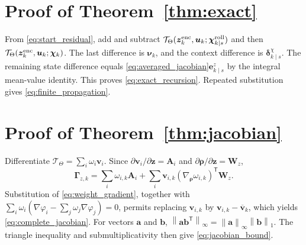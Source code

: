 \documentclass[journal]{IEEEtran}
\newcommand{\norm}[1]{\left\lVert #1\right\rVert}
\newcommand{\T}{\mathsf T}
\newcommand{\1}{\bm 1}
\begin{document}
\appendices
\section{Proof of Theorem~\ref{thm:exact}}
From \eqref{eq:start_residual}, add and subtract
$\mathcal T_\Theta(\bm z_k^{\rm enc},\bm u_k;
\bm\chi_{k\mid s}^{\rm roll})$ and then
$\mathcal T_\Theta(\bm z_k^{\rm enc},\bm u_k;\bm\chi_k)$.
The last difference is $\bm\nu_k$, and the context difference is
$\bm\delta_{k\mid s}^{\chi}$. The remaining state difference equals
\eqref{eq:averaged_jacobian}$\bm e_{k\mid s}^z$ by the integral
mean-value identity. This proves \eqref{eq:exact_recursion}. Repeated
substitution gives \eqref{eq:finite_propagation}.

\section{Proof of Theorem~\ref{thm:jacobian}}
Differentiate
$\mathcal T_\Theta=\sum_i\omega_i\bm v_i$. Since
$\partial\bm v_i/\partial\bm z=\bm A_i$ and
$\partial\bm\rho/\partial\bm z=\bm W_z$,
\begin{equation}
\bm\Gamma_{z,k}=\sum_i\omega_{i,k}\bm A_i+
\sum_i\bm v_{i,k}
(\nabla_{\bm\rho}\omega_{i,k})^\T\bm W_z.
\end{equation}
Substitution of \eqref{eq:weight_gradient}, together with
$\sum_i\omega_i(\nabla\varphi_i-\sum_j\omega_j\nabla\varphi_j)=0$,
permits replacing $\bm v_{i,k}$ by
$\bm v_{i,k}-\overline{\bm v}_k$, which yields
\eqref{eq:complete_jacobian}. For vectors $\bm a$ and $\bm b$,
$\norm{\bm a\bm b^\T}_\infty=\norm{\bm a}_\infty\norm{\bm b}_1$.
The triangle inequality and submultiplicativity then give
\eqref{eq:jacobian_bound}.
\end{document}
